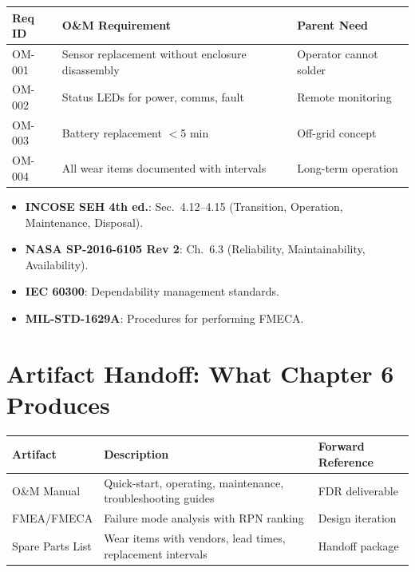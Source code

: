\documentclass[11pt,letterpaper,twoside,openany]{book}
\begin{document}
\begin{greenshieldbox}
\small
\begin{tabularx}{\textwidth}{l X l}
\toprule
\textbf{Req ID} & \textbf{O\&M Requirement} & \textbf{Parent Need} \\
\midrule
OM-001 & Sensor replacement without enclosure disassembly & Operator cannot solder \\
OM-002 & Status LEDs for power, comms, fault & Remote monitoring \\
OM-003 & Battery replacement $<$5 min & Off-grid concept \\
OM-004 & All wear items documented with intervals & Long-term operation \\
\bottomrule
\end{tabularx}
\end{greenshieldbox}

\begin{keyconceptbox}
\begin{itemize}[nosep,leftmargin=1.5em]
\item \textbf{INCOSE SEH 4th ed.}: Sec.\ 4.12--4.15 (Transition, Operation, Maintenance, Disposal).
\item \textbf{NASA SP-2016-6105 Rev 2}: Ch.\ 6.3 (Reliability, Maintainability, Availability).
\item \textbf{IEC 60300}: Dependability management standards.
\item \textbf{MIL-STD-1629A}: Procedures for performing FMECA.
\end{itemize}
\end{keyconceptbox}

\section{Artifact Handoff: What Chapter 6 Produces}
\begin{table}[htbp]\centering\small
\begin{tabularx}{\textwidth}{l X l}
\toprule
\textbf{Artifact} & \textbf{Description} & \textbf{Forward Reference} \\
\midrule
O\&M Manual & Quick-start, operating, maintenance, troubleshooting guides & FDR deliverable \\
FMEA/FMECA & Failure mode analysis with RPN ranking & Design iteration \\
Spare Parts List & Wear items with vendors, lead times, replacement intervals & Handoff package \\
\bottomrule
\end{tabularx}
\end{table}
\end{document}
